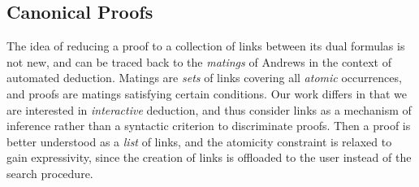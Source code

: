 \subsection*{Canonical Proofs}

The idea of reducing a proof to a collection of links between its dual formulas
is not new, and can be traced back to the \emph{matings} of Andrews
 in the context of automated deduction. Matings are
\emph{sets} of links covering all \emph{atomic} occurrences, and proofs are
matings satisfying certain conditions. Our work differs in that we are
interested in \emph{interactive} deduction, and thus consider links as a
mechanism of inference rather than a syntactic criterion to discriminate proofs.
Then a proof is better understood as a \emph{list} of links, and the atomicity
constraint is relaxed to gain expressivity, since the creation of links is
offloaded to the user instead of the search procedure.


